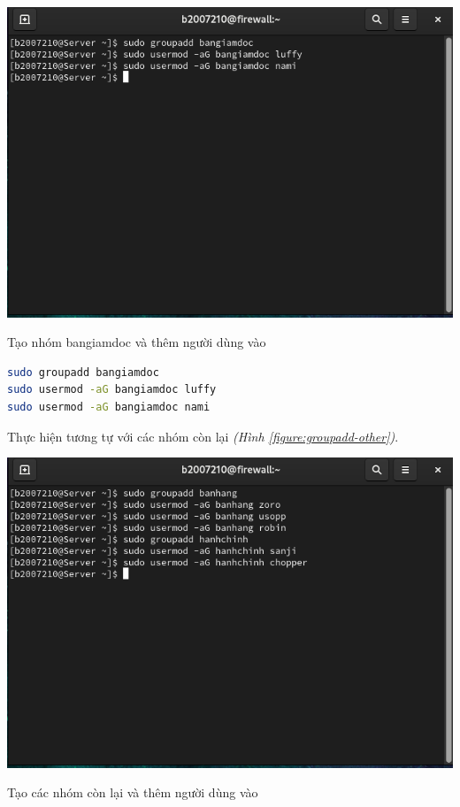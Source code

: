 \documentclass[a4paper, 11pt]{article}
\begin{document}
\begin{minipage}
    {\linewidth}
    \captionsetup{type=figure}
    \centering
    \includegraphics[width=\linewidth]{images/groupadd-bangiamdoc.png}
    \caption{Tạo nhóm bangiamdoc và thêm người dùng vào}
    \label{figure:groupadd-bangiamdoc}
\end{minipage}

\begin{lstlisting}[language=bash, caption=Tạo nhóm \texttt{bangiamdoc} và thêm người dùng vào]
sudo groupadd bangiamdoc
sudo usermod -aG bangiamdoc luffy
sudo usermod -aG bangiamdoc nami
\end{lstlisting}

Thực hiện tương tự với các nhóm còn lại \textit{(Hình \ref{figure:groupadd-other})}.

\begin{minipage}
    {\linewidth}
    \captionsetup{type=figure}
    \centering
    \includegraphics[width=\linewidth]{images/groupadd-other.png}
    \caption{Tạo các nhóm còn lại và thêm người dùng vào}
    \label{figure:groupadd-other}
\end{minipage}
\end{document}
